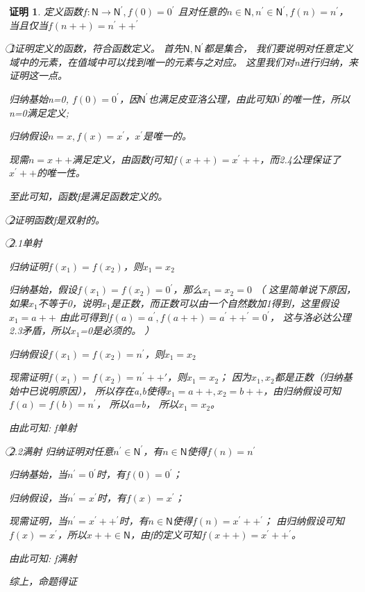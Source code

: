 \documentclass{article}
\theoremstyle{mystyle}
\theoremstyle{zproofstyle}
\newtheorem*{zproof}{证明}
\begin{document}
\begin{zproof}
  定义函数$f: \mathsf{N} \rightarrow \mathsf{N}^\prime, f(0)=0^\prime$
  且对任意的$n \in \mathsf{N}, n^\prime \in \mathsf{N}^\prime, f(n) = n^\prime$，
  当且仅当$f(n++)=n^\prime++^\prime$

  \textcircled{1}证明定义的函数，符合函数定义。
  首先$\mathsf{N},\mathsf{N}^\prime$都是集合，
  我们要说明对任意定义域中的元素，在值域中可以找到唯一的元素与之对应。
  这里我们对n进行归纳，来证明这一点。

  归纳基始n=0, $f(0) = 0^\prime$，因$\mathsf{N}^\prime$也满足皮亚洛公理，由此可知$0^\prime$的唯一性，所以n=0满足定义;

  归纳假设$n=x,f(x) = x^\prime$，$x^\prime$是唯一的。

  现需$n=x++$满足定义，由函数f可知$f(x++) = x^\prime ++$，而2.4公理保证了$x^\prime ++$的唯一性。

  至此可知，函数f是满足函数定义的。

  \textcircled{2}证明函数f是双射的。

  \textcircled{2.1}单射

  归纳证明$f(x_1) = f(x_2)$，则$x_1 = x_2$

  归纳基始，假设$f(x_1)=f(x_2)=0^\prime$，那么$x_1=x_2=0$
  （
  这里简单说下原因，
  如果$x_1$不等于0，说明$x_1$是正数，而正数可以由一个自然数加1得到，这里假设$x_1=a++$
  由此可得到$f(a) = a^\prime,f(a++)=a^\prime++^\prime = 0^\prime$，
  这与洛必达公理2.3矛盾，所以$x_1$=0是必须的。
  ）

  归纳假设$f(x_1) = f(x_2) = n^\prime$，则$x_1 = x_2$

  现需证明$f(x_1) = f(x_2) = n^\prime++\prime$，则$x_1 = x_2$；
  因为$x_1,x_2$都是正数（归纳基始中已说明原因），
  所以存在a,b使得$x_1 = a++, x_2 = b++$，由归纳假设可知$f(a) = f(b) = n^\prime$，
  所以a=b，
  所以$x_1 = x_2$。

  由此可知: f单射

  \textcircled{2.2}满射
  归纳证明对任意$n^\prime \in \mathsf{N}^\prime$，有$n \in \mathsf{N}$使得$f(n)=n^\prime$

  归纳基始，当$n^\prime=0^\prime$时，有$f(0) = 0^\prime$；

  归纳假设，当$n^\prime=x^\prime$时，有$f(x)=x^\prime$；

  现需证明，当$n^\prime=x^\prime++^\prime$时，有$n \in \mathsf{N}$使得$f(n)=x^\prime++^\prime$；
  由归纳假设可知$f(x)=x^\prime$，所以$x++ \in \mathsf{N}$，由f的定义可知$f(x++)=x^\prime++^\prime$。

  由此可知: f满射

  综上，命题得证

\end{zproof}
\end{document}

